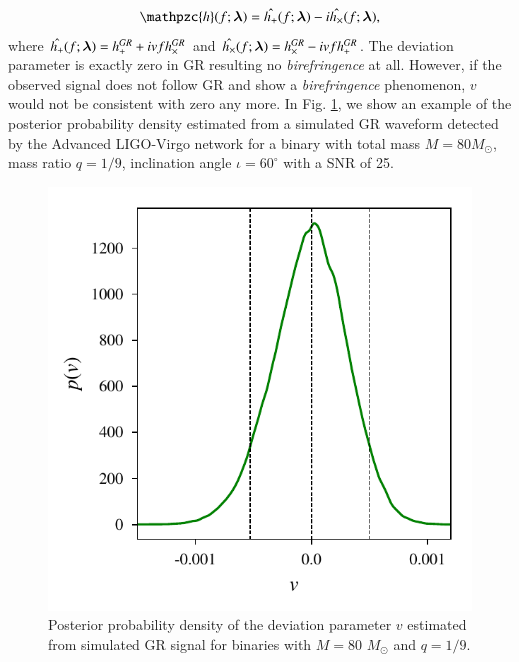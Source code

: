 \documentclass[prd,preprintnumbers,twocolumn,eqsecnum,floatfix,a4paper,nofootinbib,superscriptaddress]{revtex4}
\newcommand{\h}{\mathpzc{h}}
\newcommand{\blambda}{\bm{\lambda}}
\begin{document}
\begin{eqnarray} 
\h(f; \blambda) =  \Hat{h_+}(f; \blambda) - i \Hat{h_\times}(f; \blambda),
\label{eq:test_cs}
\end{eqnarray}
where $\Hat{h_+}(f; \blambda)=h^{GR}_+ + i v f h^{GR}_{\times}$ and $\Hat{h_\times}(f; \blambda)=h^{GR}_\times - i v f h^{GR}_{+}$. The deviation parameter is exactly zero in GR resulting no \textit{birefringence} at all. However, if the observed signal does not follow GR and show a \textit{birefringence} phenomenon, $v$ would not be consistent with zero any more. In Fig. \ref{fig:cs_hist}, we show an example of the posterior probability density estimated from a simulated GR waveform detected by the Advanced LIGO-Virgo network for a binary with total mass $M = 80M_{\odot}$, mass ratio $q=1/9$, inclination angle $ {\iota}=60^{\circ} $ with a SNR of 25. 

\begin{figure}[htb]
	\begin{center}
		\includegraphics[scale=0.7]{figs/v1_GR_hist_M_80_q_9_dL_250.pdf} 
	\end{center} 
	\caption{Posterior probability density of the deviation parameter $v$ estimated from simulated GR signal for binaries with $M=80$ $M_{\odot}$ and $q=1/9$. }
	\label{fig:cs_hist}
\end{figure}
\end{document}
